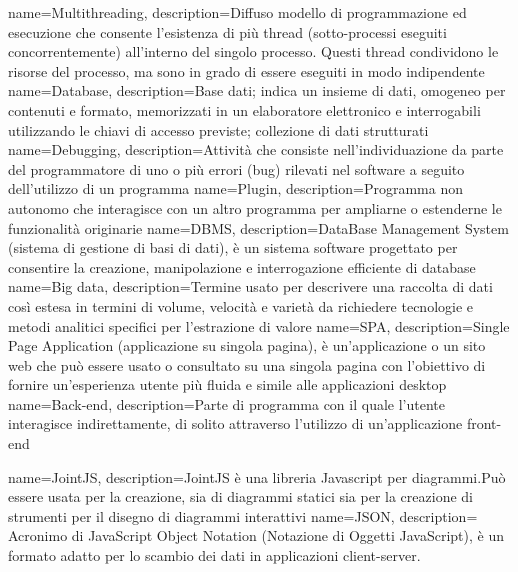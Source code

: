  {
	name=Multithreading,
	description={Diffuso modello di programmazione ed esecuzione che consente l'esistenza
	di più thread (sotto-processi eseguiti concorrentemente) all'interno del singolo processo.
	Questi thread condividono le risorse del processo, ma sono in grado di essere eseguiti in
	modo indipendente}
}
 {
	name=Database,
	description={Base dati; indica un insieme di dati, omogeneo per contenuti e formato,
	memorizzati in un elaboratore elettronico e interrogabili utilizzando le chiavi di
	accesso previste; collezione di dati strutturati}
}
 {
	name=Debugging,
	description={Attività che consiste nell'individuazione da parte del programmatore di uno
	o più errori (bug) rilevati nel software a seguito dell'utilizzo di un programma}
}
 {
	name=Plugin,
	description={Programma non autonomo che interagisce con un altro programma per ampliarne
	o estenderne le funzionalità originarie}
}
 {
	name=DBMS,
	description={DataBase Management System (sistema di gestione di basi di dati), è un
	sistema software progettato per consentire la creazione, manipolazione e interrogazione
	efficiente di database}
}
 {
	name=Big data,
	description={Termine usato per descrivere una raccolta di dati così estesa in termini di
	volume, velocità e varietà da richiedere tecnologie e metodi analitici specifici per
	l'estrazione di valore}
}
 {
	name=SPA,
	description={Single Page Application (applicazione su singola pagina), è un'applicazione
	o un sito web che può essere usato o consultato su una singola pagina con l'obiettivo di
	fornire un'esperienza utente più fluida e simile alle applicazioni desktop}
}
 {
	name=Back-end,
	description={Parte di programma con il quale l'utente interagisce indirettamente, di solito
	attraverso l'utilizzo di un'applicazione front-end}
}

 {
name=JointJS,
description={JointJS è una libreria Javascript per diagrammi.Può essere usata per la creazione,
	 sia di diagrammi statici sia per la creazione di strumenti per il disegno di diagrammi 
	 interattivi}
}
 {
name=JSON,
description={ Acronimo di JavaScript Object Notation (Notazione di Oggetti JavaScript), è un formato adatto per lo scambio dei dati in applicazioni client-server.}
}